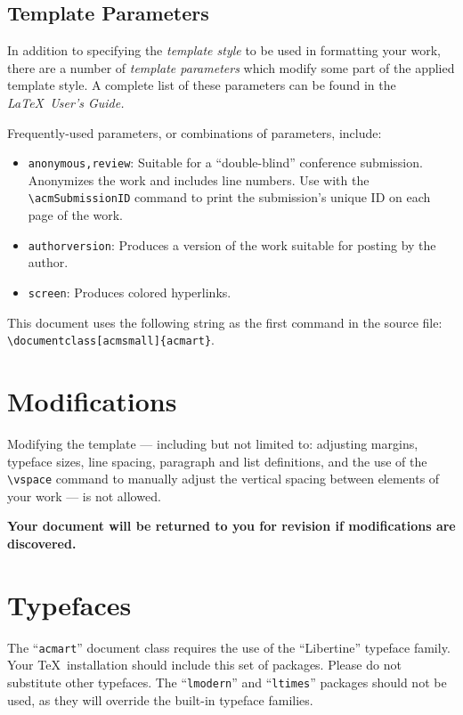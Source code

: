 \documentclass[acmsmall]{acmart}
\begin{document}
\subsection{Template Parameters}

In addition to specifying the {\itshape template style} to be used in
formatting your work, there are a number of {\itshape template parameters}
which modify some part of the applied template style. A complete list
of these parameters can be found in the {\itshape \LaTeX\ User's Guide.}

Frequently-used parameters, or combinations of parameters, include:
\begin{itemize}
\item {\verb|anonymous,review|}: Suitable for a ``double-blind''
  conference submission. Anonymizes the work and includes line
  numbers. Use with the \verb|\acmSubmissionID| command to print the
  submission's unique ID on each page of the work.
\item{\verb|authorversion|}: Produces a version of the work suitable
  for posting by the author.
\item{\verb|screen|}: Produces colored hyperlinks.
\end{itemize}

This document uses the following string as the first command in the
source file:
\verb|\documentclass[acmsmall]{acmart}|.

\section{Modifications}

Modifying the template --- including but not limited to: adjusting
margins, typeface sizes, line spacing, paragraph and list definitions,
and the use of the \verb|\vspace| command to manually adjust the
vertical spacing between elements of your work --- is not allowed.

{\bfseries Your document will be returned to you for revision if
  modifications are discovered.}

\section{Typefaces}

The ``\verb|acmart|'' document class requires the use of the
``Libertine'' typeface family. Your \TeX\ installation should include
this set of packages. Please do not substitute other typefaces. The
``\verb|lmodern|'' and ``\verb|ltimes|'' packages should not be used,
as they will override the built-in typeface families.
\end{document}
